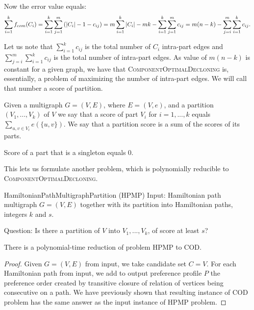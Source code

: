 Now the error value equals:
$$
\sum_{i=1}^k f_{com}(C_i) =
\sum_{i=1}^k \sum_{j=1}^m \left( \left\vert C_i \right\vert - 1 - c_{ij} \right) =
m \sum_{i=1}^k \left\vert C_i \right\vert - m k - \sum_{i=1}^k \sum_{j=1}^m c_{ij} =
m(n-k) - \sum_{j=i}^m \sum_{i=1}^k c_{ij}
\text{.}$$

Let us note that $\sum_{i=1}^k c_{ij}$ is the total number of $C_i$ intra-part edges
and $\sum_{j=i}^m \sum_{i=1}^k c_{ij}$ is the total number of intra-part edges.
As value of $m(n-k)$ is constant for a given graph,
we have that \textsc{ComponentOptimalDecloning} is, essentially, a problem of maximizing the number of intra-part edges.
We will call that number a score of partition.

\begin{defn}
Given a multigraph $G=(V,E)$, where $E=(V,e)$, and a partition $(V_1, ..., V_k)$ of $V$
we say that a score of part $V_i$ for $i=1,...,k$ equals $\sum_{u,v \in V_i} e(\{u,v\})$.
We say that a partition score is a sum of the scores of its parts.
\end{defn}

\begin{rmrk}
Score of a part that is a singleton equals $0$.
\end{rmrk}

This lets us formulate another problem, which is polynomially reducible
to \textsc{ComponentOptimalDecloning}.

\begin{problem}{HamiltonianPathMultigraphPartition (HPMP)}
	Input: Hamiltonian path multigraph $G=(V,E)$
		together with its partition into Hamiltonian paths, integers $k$ and $s$.

	Question: Is there a partition of $V$ into $V_1, ..., V_k$,
        of score at least $s$?
\end{problem}

\begin{thm}
There is a polynomial-time reduction of problem \textsc{HPMP} to \textsc{COD}.
\end{thm}

\begin{proof}
Given $G=(V,E)$ from input, we take candidate set $C=V$.
For each Hamiltonian path from input, we add to output preference profile $P$
the preference order created by transitive closure of relation of vertices being consecutive on a path.
We have previously shown that resulting instance of \textsc{COD} problem 
has the same answer as the input instance of \textsc{HPMP} problem.
\end{proof}


